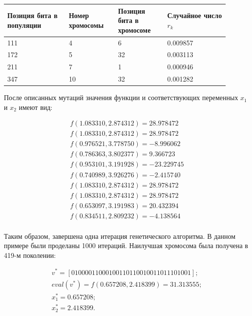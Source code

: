 \begin{center}
\begin{tabular}{|p{0.25\linewidth}|p{0.2\linewidth}|p{0.2\linewidth}|p{0.25\linewidth}|}
  \hline
  Позиция бита в популяции  & Номер хромосомы & Позиция бита в хромосоме & Случайное число $r_k$ \\
  \hline
  111                       & 4               & 6                        & 0.009857 \\
  \hline
  172                       & 5               & 32                       & 0.003113 \\
  \hline
  211                       & 7               & 1                        & 0.000946 \\
  \hline
  347                       & 10              & 32                       & 0.001282 \\
  \hline
\end{tabular}
\end{center}

После описанных мутаций значения функции и соответствующих переменных $x_{1}$ и $x_{2}$
имеют вид:

\begin{equation*}
  \begin{array}{l}
    f(1.083310, 2.874312) = 28.978472 \\
    f(1.083310, 2.874312) = 28.978472 \\
    f(0.976521, 3.778750) = -8.996062 \\
    f(0.786363, 3.802377) =  9.366723 \\
    f(0.953101, 3.191928) = -23.229745 \\
    f(0.740989, 3.926276) = -2.415740 \\
    f(1.083310, 2.874312) = 28.978472 \\
    f(1.083310, 2.874312) = 28.978472 \\
    f(0.653097, 3.191983) = 20.432394 \\
    f(0.834511, 2.809232) = -4.138564 \\
  \end{array}
\end{equation*}

Таким образом, завершена одна итерация генетического алгоритма.
В данном примере были проделаны 1000 итераций. Наилучшая хромосома была
получена в 419-м поколении:

\begin{equation*}
  \begin{array}{l}
    v^{*} = [01000011000100110110010011011101001]; \\
    eval(v^*) = f(0.657208, 2.418399) = 31.313555; \\
    x_{1}^* = 0.657208; \\
    x_{2}^* = 2.418399.
  \end{array}
\end{equation*}
